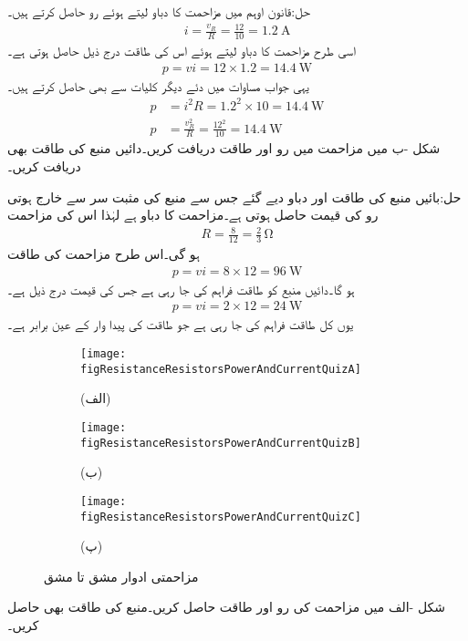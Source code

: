 حل:قانون اوہم میں مزاحمت کا دباو  لیتے ہوئے رو حاصل کرتے ہیں۔
\begin{align*}
i=\frac{v_R}{R}=\frac{12}{10}=\SI{1.2}{\ampere}
\end{align*}
اسی طرح مزاحمت کا دباو  لیتے ہوئے اس کی طاقت درج ذیل حاصل ہوتی ہے۔
\begin{align*}
p=v i =12 \times 1.2=\SI{14.4}{\watt}
\end{align*}
یہی جواب مساوات  میں دئے دیگر کلیات سے بھی حاصل کرتے ہیں۔
\begin{align*}
p&=i^2 R=1.2^2\times 10=\SI{14.4}{\watt}\\
p&=\frac{v_R^2}{R}=\frac{12^2}{10}=\SI{14.4}{\watt}
\end{align*}
شکل -ب میں مزاحمت میں رو اور طاقت دریافت کریں۔دائیں منبع کی طاقت بھی دریافت کریں۔

حل:بائیں منبع کی طاقت اور دباو دیے گئے جس سے منبع کی مثبت سر سے خارج ہوتی رو کی قیمت  حاصل ہوتی ہے۔مزاحمت کا دباو  ہے  لہٰذا اس کی مزاحمت
\begin{align*}
R=\frac{8}{12}=\frac{2}{3} \, \si{\ohm}
\end{align*}
ہو گی۔اس طرح مزاحمت کی طاقت
\begin{align*}
p=v i=8 \times 12=\SI{96}{\watt}
\end{align*}
ہو گا۔دائیں منبع کو طاقت فراہم کی جا رہی ہے جس کی قیمت درج ذیل ہے۔
\begin{align*}
p=v i =2 \times 12=\SI{24}{\watt}
\end{align*}
یوں کل  طاقت فراہم کی جا رہی ہے جو طاقت کی پیدا وار کے عین برابر ہے۔
\FloatBarrier

\begin{figure}
\centering
\begin{subfigure}{0.33\textwidth}
\texttt{[image: figResistanceResistorsPowerAndCurrentQuizA]}
\caption*{(الف)}
\end{subfigure}%
%
\begin{subfigure}{0.33\textwidth}
\texttt{[image: figResistanceResistorsPowerAndCurrentQuizB]}
\caption*{(ب)}
\end{subfigure}%
\begin{subfigure}{0.33\textwidth}
\texttt{[image: figResistanceResistorsPowerAndCurrentQuizC]}
\caption*{(پ)}
\end{subfigure}%
\caption{مزاحمتی ادوار مشق  تا مشق }
\label{شکل_مزاحمتی_اکلوتا_مزاحمت_طاقت_رو_مشق}
\end{figure}
شکل -الف میں مزاحمت کی رو اور طاقت حاصل کریں۔منبع کی طاقت بھی حاصل کریں۔

